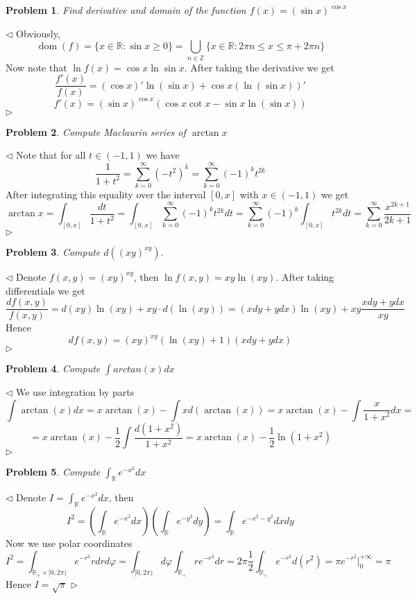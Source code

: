 \documentclass[12pt]{article}
\newtheorem{problem}{Problem}[subsection]
\newenvironment{solution}{\par $\triangleleft$}{$\triangleright$}
\begin{document}
 
\begin{problem} Find derivative and domain of the function $f(x)=(\sin x)^{\cos x}$
\end{problem}
\begin{solution} Obviously, 
$$
\operatorname{dom}(f)=\{x\in\mathbb{R}:\sin x\geq 0\}=\bigcup_{n\in\mathbb{Z}}\{x\in\mathbb{R}:2\pi n\leq x\leq \pi+2\pi n\}
$$
Now note that $\ln f(x)=\cos x\ln\sin x$. After taking the derivative we get
$$
\frac{f'(x)}{f(x)}=(\cos x)'\ln(\sin x)+\cos x(\ln(\sin x))'
$$
$$
f'(x)=(\sin x)^{\cos x}(\cos x\cot x-\sin x\ln(\sin x))
$$
\end{solution}
 
\begin{problem} Compute Maclaurin series of $\arctan x$
\end{problem}
\begin{solution} Note that for all $t\in(-1,1)$ we have
$$
\frac{1}{1+t^2}=\sum_{k=0}^\infty(-t^2)^k=\sum_{k=0}^\infty(-1)^kt^{2k}
$$
After integrating this equality over the interval $[0,x]$ with $x\in(-1,1)$ we get
$$
\arctan x=\int_{[0,x]}\frac{dt}{1+t^2}=\int_{[0,x]}\sum_{k=0}^\infty(-1)^kt^{2k}dt=\sum_{k=0}^\infty(-1)^k\int_{[0,x]}t^{2k}dt
=\sum_{k=0}^\infty\frac{x^{2k+1}}{2k+1}
$$
\end{solution}
 
 
\begin{problem} Compute $d((xy)^{xy})$.
\end{problem}
\begin{solution} Denote $f(x,y)=(xy)^{xy}$, then $\ln f(x,y)=xy\ln(xy)$. After taking differentials we get
$$
\frac{d f(x,y)}{f(x,y)}=d(xy)\ln (xy)+xy\cdot d(\ln(xy))=(xdy+ydx)\ln(xy)+xy\frac{xdy+ydx}{xy}
$$
Hence
$$
df(x,y)=(xy)^{xy}(\ln(xy)+1)(xdy+ydx)
$$
\end{solution}
 
 
\begin{problem} Compute $\int arctan(x)dx$
\end{problem}
\begin{solution} We use integration by parts
$$
\int\arctan(x)dx=x\arctan(x)-\int xd(\arctan(x))=x\arctan(x)-\int\frac{x}{1+x^2}dx=
$$
$$
=x\arctan(x)-\frac{1}{2}\int\frac{d(1+x^2)}{1+x^2}=x\arctan(x)-\frac{1}{2}\ln(1+x^2)
$$
\end{solution}
 
\begin{problem} Compute $\int_{\mathbb{R}} e^{-x^2}dx$
\end{problem}
\begin{solution} Denote $I=\int_{\mathbb{R}} e^{-x^2}dx$, then
$$
I^2
=\left(\int_{\mathbb{R}} e^{-x^2}dx\right)\left(\int_{\mathbb{R}} e^{-y^2}dy\right)
=\int_{\mathbb{R}} e^{-x^2-y^2}dxdy
$$
Now we use polar coordinates
$$
I^2
=\int_{\mathbb{R}_+\times[0,2\pi)}e^{-r^2}rdrd\varphi
=\int_{[0,2\pi)}d\varphi\int_{\mathbb{R}_+}re^{-r^2}dr
=2\pi\frac{1}{2}\int_{\mathbb{R}_+}e^{-r^2}d(r^2)
=\pi e^{-r^2}\Biggl|_{0}^{+\infty}=\pi
$$
Hence $I=\sqrt{\pi}$
\end{solution}
 
\end{document}
